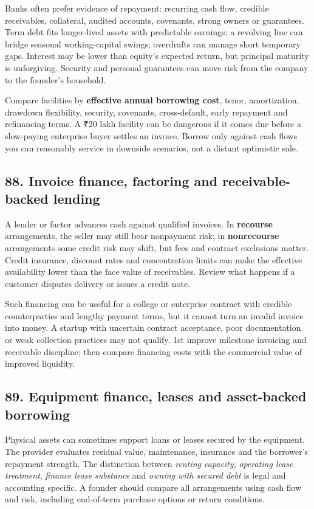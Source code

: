 Banks often prefer evidence of repayment: recurring cash flow, credible receivables, collateral, audited accounts, covenants, strong owners or guarantees. Term debt fits longer-lived assets with predictable earnings; a revolving line can bridge seasonal working-capital swings; overdrafts can manage short temporary gaps. Interest may be lower than equity's expected return, but principal maturity is unforgiving. Security and personal guarantees can move risk from the company to the founder's household.

Compare facilities by \textbf{effective annual borrowing cost}, tenor, amortization, drawdown flexibility, security, covenants, cross-default, early repayment and refinancing terms. A ₹20 lakh facility can be dangerous if it comes due before a slow-paying enterprise buyer settles an invoice. Borrow only against cash flows you can reasonably service in downside scenarios, not a distant optimistic sale.

\subsection{88. Invoice finance, factoring and receivable-backed lending}


A lender or factor advances cash against qualified invoices. In \textbf{recourse} arrangements, the seller may still bear nonpayment risk; in \textbf{nonrecourse} arrangements some credit risk may shift, but fees and contract exclusions matter. Credit insurance, discount rates and concentration limits can make the effective availability lower than the face value of receivables. Review what happens if a customer disputes delivery or issues a credit note.

Such financing can be useful for a college or enterprise contract with credible counterparties and lengthy payment terms, but it cannot turn an invalid invoice into money. A startup with uncertain contract acceptance, poor documentation or weak collection practices may not qualify. 1st improve milestone invoicing and receivable discipline; then compare financing costs with the commercial value of improved liquidity.

\subsection{89. Equipment finance, leases and asset-backed borrowing}


Physical assets can sometimes support loans or leases secured by the equipment. The provider evaluates residual value, maintenance, insurance and the borrower's repayment strength. The distinction between \textit{renting capacity}, \textit{operating lease treatment}, \textit{finance lease substance} and \textit{owning with secured debt} is legal and accounting specific. A founder should compare all arrangements using cash flow and risk, including end-of-term purchase options or return conditions.

